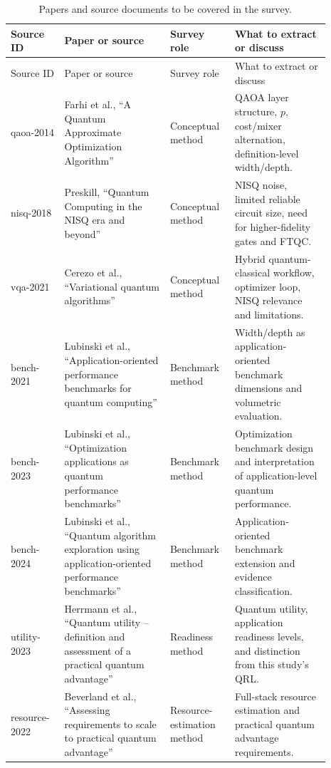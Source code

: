 \begingroup
\scriptsize
\setlength{\tabcolsep}{2pt}
\begin{longtable}{>{\raggedright\arraybackslash}p{0.15\linewidth}>{\raggedright\arraybackslash}p{0.30\linewidth}>{\raggedright\arraybackslash}p{0.17\linewidth}>{\raggedright\arraybackslash}p{0.27\linewidth}}
\caption{Papers and source documents to be covered in the survey.}
\label{tab:survey-paper-list}\\
\toprule
Source ID & Paper or source & Survey role & What to extract or discuss \\
\midrule
\endfirsthead
\toprule
Source ID & Paper or source & Survey role & What to extract or discuss \\
\midrule
\endhead
qaoa-2014 & Farhi et al., ``A Quantum Approximate Optimization Algorithm'' & Conceptual method & QAOA layer structure, $p$, cost/mixer alternation, definition-level width/depth. \\
nisq-2018 & Preskill, ``Quantum Computing in the NISQ era and beyond'' & Conceptual method & NISQ noise, limited reliable circuit size, need for higher-fidelity gates and FTQC. \\
vqa-2021 & Cerezo et al., ``Variational quantum algorithms'' & Conceptual method & Hybrid quantum-classical workflow, optimizer loop, NISQ relevance and limitations. \\
bench-2021 & Lubinski et al., ``Application-oriented performance benchmarks for quantum computing'' & Benchmark method & Width/depth as application-oriented benchmark dimensions and volumetric evaluation. \\
bench-2023 & Lubinski et al., ``Optimization applications as quantum performance benchmarks'' & Benchmark method & Optimization benchmark design and interpretation of application-level quantum performance. \\
bench-2024 & Lubinski et al., ``Quantum algorithm exploration using application-oriented performance benchmarks'' & Benchmark method & Application-oriented benchmark extension and evidence classification. \\
utility-2023 & Herrmann et al., ``Quantum utility -- definition and assessment of a practical quantum advantage'' & Readiness method & Quantum utility, application readiness levels, and distinction from this study's QRL. \\
resource-2022 & Beverland et al., ``Assessing requirements to scale to practical quantum advantage'' & Resource-estimation method & Full-stack resource estimation and practical quantum advantage requirements. \\

\end{longtable}
